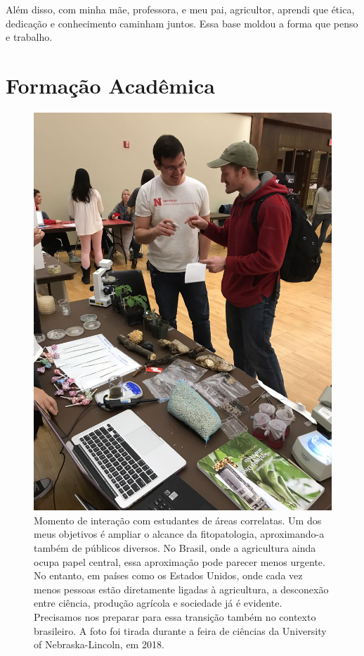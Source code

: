 \documentclass[12pt,a4paper,oneside]{book}
\newcommand{\UNL}{University of Nebraska-Lincoln}
\newcommand{\HeroFigPad}{\vspace{-1cm}}
\begin{document}
Além disso, com minha mãe, professora, e meu pai, agricultor, aprendi que ética, dedicação e conhecimento
caminham juntos. Essa base moldou a forma que penso e trabalho.

\chapter{Formação Acadêmica}
\label{cap_formacao}

\begin{figure}[h]
  \HeroFigPad
  \begin{center}
    \includegraphics[height=0.4\textheight, keepaspectratio]{images/2018-fungal-booth.jpg}
  \end{center}
  \caption{
  Momento de interação com estudantes de áreas correlatas. Um dos meus objetivos é ampliar o alcance 
  da fitopatologia, aproximando-a também de públicos diversos. No Brasil, onde a agricultura ainda 
  ocupa papel central, essa aproximação pode parecer menos urgente. No entanto, em países como os 
  Estados Unidos, onde cada vez menos pessoas estão diretamente ligadas à agricultura, a desconexão 
  entre ciência, produção agrícola e sociedade já é evidente. Precisamos nos preparar para essa 
  transição também no contexto brasileiro. A foto foi tirada durante a feira de ciências da \UNL{}, em 2018.
  }
\end{figure}
\end{document}
